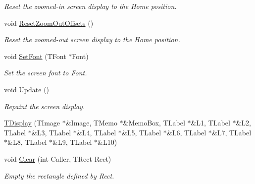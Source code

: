 \begin{DoxyCompactItemize}
\begin{DoxyCompactList}\small\item\em Reset the zoomed-\/in screen display to the \textquotesingle{}Home\textquotesingle{} position. \end{DoxyCompactList}\item 
\mbox{\label{class_t_display_aae6570b04021b9a6e1748eb7f2bdf325}} 
void \mbox{\hyperlink{class_t_display_aae6570b04021b9a6e1748eb7f2bdf325}{Reset\+Zoom\+Out\+Offsets}} ()
\begin{DoxyCompactList}\small\item\em Reset the zoomed-\/out screen display to the \textquotesingle{}Home\textquotesingle{} position. \end{DoxyCompactList}\item 
\mbox{\label{class_t_display_af1ddcf928f3f5f3a39504f4e12bd51c0}} 
void \mbox{\hyperlink{class_t_display_af1ddcf928f3f5f3a39504f4e12bd51c0}{Set\+Font}} (T\+Font $\ast$Font)
\begin{DoxyCompactList}\small\item\em Set the screen font to \textquotesingle{}Font\textquotesingle{}. \end{DoxyCompactList}\item 
\mbox{\label{class_t_display_aa4f37ab2a4df6437a2219f303e1de40b}} 
void \mbox{\hyperlink{class_t_display_aa4f37ab2a4df6437a2219f303e1de40b}{Update}} ()
\begin{DoxyCompactList}\small\item\em Repaint the screen display. \end{DoxyCompactList}\item 
\mbox{\hyperlink{class_t_display_a72cbdba53131a636da2c656f6025574b}{T\+Display}} (T\+Image $\ast$\&Image, T\+Memo $\ast$\&Memo\+Box, T\+Label $\ast$\&L1, T\+Label $\ast$\&L2, T\+Label $\ast$\&L3, T\+Label $\ast$\&L4, T\+Label $\ast$\&L5, T\+Label $\ast$\&L6, T\+Label $\ast$\&L7, T\+Label $\ast$\&L8, T\+Label $\ast$\&L9, T\+Label $\ast$\&L10)
\item 
\mbox{\label{class_t_display_ab96c1fdec64997a8c252704ea6c231bf}} 
void \mbox{\hyperlink{class_t_display_ab96c1fdec64997a8c252704ea6c231bf}{Clear}} (int Caller, T\+Rect Rect)
\begin{DoxyCompactList}\small\item\em Empty the rectangle defined by Rect. \end{DoxyCompactList}\item 

\end{DoxyCompactItemize}

